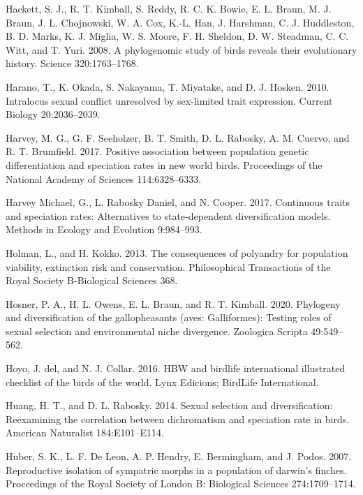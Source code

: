 \documentclass[]{article}
\begin{document}
\leavevmode\hypertarget{ref-Hackett_2008}{}%
Hackett, S. J., R. T. Kimball, S. Reddy, R. C. K. Bowie, E. L. Braun, M.
J. Braun, J. L. Chojnowski, W. A. Cox, K.-L. Han, J. Harshman, C. J.
Huddleston, B. D. Marks, K. J. Miglia, W. S. Moore, F. H. Sheldon, D. W.
Steadman, C. C. Witt, and T. Yuri. 2008. A phylogenomic study of birds
reveals their evolutionary history. Science 320:1763--1768.

\leavevmode\hypertarget{ref-harano2010intralocus}{}%
Harano, T., K. Okada, S. Nakayama, T. Miyatake, and D. J. Hosken. 2010.
Intralocus sexual conflict unresolved by sex-limited trait expression.
Current Biology 20:2036--2039.

\leavevmode\hypertarget{ref-Harvey_2017}{}%
Harvey, M. G., G. F. Seeholzer, B. T. Smith, D. L. Rabosky, A. M.
Cuervo, and R. T. Brumfield. 2017. Positive association between
population genetic differentiation and speciation rates in new world
birds. Proceedings of the National Academy of Sciences 114:6328--6333.

\leavevmode\hypertarget{ref-Harvey_essim_2017}{}%
Harvey Michael, G., L. Rabosky Daniel, and N. Cooper. 2017. Continuous
traits and speciation rates: Alternatives to state‐dependent
diversification models. Methods in Ecology and Evolution 9:984--993.

\leavevmode\hypertarget{ref-Holman_Kokko_2013}{}%
Holman, L., and H. Kokko. 2013. The consequences of polyandry for
population viability, extinction risk and conservation. Philosophical
Transactions of the Royal Society B-Biological Sciences 368.

\leavevmode\hypertarget{ref-Hosner_2020}{}%
Hosner, P. A., H. L. Owens, E. L. Braun, and R. T. Kimball. 2020.
Phylogeny and diversification of the gallopheasants (aves: Galliformes):
Testing roles of sexual selection and environmental niche divergence.
Zoologica Scripta 49:549--562.

\leavevmode\hypertarget{ref-delhoyo_2016}{}%
Hoyo, J. del, and N. J. Collar. 2016. HBW and birdlife international
illustrated checklist of the birds of the world. Lynx Edicions; BirdLife
International.

\leavevmode\hypertarget{ref-Huang_2014}{}%
Huang, H. T., and D. L. Rabosky. 2014. Sexual selection and
diversification: Reexamining the correlation between dichromatism and
speciation rate in birds. American Naturalist 184:E101--E114.

\leavevmode\hypertarget{ref-Huber_2007}{}%
Huber, S. K., L. F. De Leon, A. P. Hendry, E. Bermingham, and J. Podos.
2007. Reproductive isolation of sympatric morphs in a population of
darwin's finches. Proceedings of the Royal Society of London B:
Biological Sciences 274:1709--1714.
\end{document}
